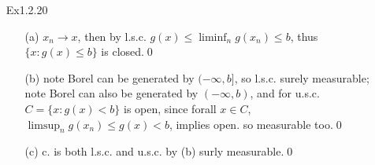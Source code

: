 \documentclass[paper=a4, fontsize=11pt]{scrartcl} %
\numberwithin{equation}{section} %
\numberwithin{figure}{section} %
\numberwithin{table}{section} %
\begin{document}
\begin{itemize}
\begin{itemize}
	 	\begin{align}
	 		P(\bigcup_i^n A_i \bigtriangleup \bigcup_i C_i) &\leq P(\bigcup_i^n A_i\bigtriangleup \bigcup_i^n C_i)) + P(D\setminus D_n)\\
	 		&< P(\bigcup_i^n (A_i\bigtriangleup  C_i)) + \epsilon/2\\
	 		&< \epsilon
	 	\end{align}
	 	since $\epsilon\rightarrow 0$, which shows $D\in \mathcal{C}$, implies $\mathcal{C}$ is $\sigma$-algebra, contains $\mathcal{F}=\sigma(\mathcal{A})$.\qed
	 	\item[(b)] recall SF in prop1.2.6, use the technique cut $n$ into $n2^n$ subintervals, let $B_k = X^{-1}((k2^{-n},(k+1)2^{-n}])\in \mathcal{F}$, by (a), $\exists A_k\in\mathcal{A}$ s.t. $P(A_k\bigtriangleup B_k)<\delta=\epsilon/(n2^n)$, let $Y=\sum_{k=0}^{n2^n-1}k2^{-n} I_{A_k}$, note $n$ is selected as $X$ is bounded, and that $2^{-n}<\epsilon$, then
	 	\begin{align}
	 		P(|X-Y|>\epsilon)&\leq P(\bigcup_{k=0}^{n2^n-1} I_{B_k}\neq I_{A_k}) \\
	 			& \leq \sum_{k=0}^{n2^n-1} P(A_k\bigtriangleup B_k)\\
	 			& <\epsilon
	 	\end{align}\qed
	 \end{itemize}
	 \item[Ex1.2.20]
	 \begin{itemize}
	 	\item[(a)] $x_n\rightarrow x$, then by l.s.c. $g(x)\leq \liminf_n g(x_n)\leq b$, thus $\{x:g(x)\leq b\}$ is closed.\qed
	 	\item[(b)] note Borel can be generated by $(-\infty,b]$, so l.s.c. surely measurable; note Borel can also be generated by $(-\infty,b)$, and for u.s.c. $C=\{x:g(x)<b\}$ is open, since forall $x\in C$, $\limsup_n g(x_n) \leq g(x)<b$, implies open. so measurable too.\qed
	 	\item[(c)] c. is both l.s.c. and u.s.c. by (b) surly measurable.\qed
	 \end{itemize}

\end{itemize}
\end{document}
